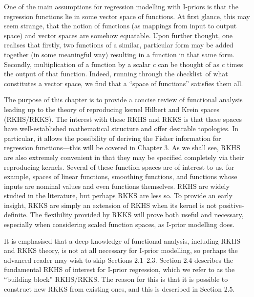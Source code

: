 \documentclass[a4paper,showframe,11pt,draft]{report}
\begin{document}

One of the main assumptions for regression modelling with I-priors is that the regression functions lie in some vector space of functions.
At first glance, this may seem strange, that the notion of functions (as mappings from input to output space) and vector spaces are somehow equatable.
Upon further thought, one realises that firstly, two functions of a similar, particular form may be added together (in some meaningful way) resulting in a function in that same form. 
Secondly, multiplication of a function by a scalar $c$ can be thought of as $c$ times the output of that function.
Indeed, running through the checklist\footnotemark~of what constitutes a vector space, we find that a ``space of functions'' satisfies them all.

The purpose of this chapter is to provide a concise review of functional analysis leading up to the theory of reproducing kernel Hilbert and Krein spaces (RKHS/RKKS).
The interest with these RKHS and RKKS is that these spaces have well-established mathematical structure and offer desirable topologies.
In particular, it allows the possibility of deriving the Fisher information for regression functions---this will be covered in Chapter 3.
As we shall see, RKHS are also extremely convenient in that they may be specified completely via their reproducing kernels.
Several of these function spaces are of interest to us, for example, spaces of linear functions, smoothing functions, and functions whose inputs are nominal values and even functions themselves.
RKHS are widely studied in the literature, but perhaps RKKS are less so.
To provide an early insight, RKKS are simply an extension of RKHS when its kernel is not positive-definite.
The flexibility provided by RKKS will prove both useful and necessary, especially when considering scaled function spaces, as I-prior modelling does.

It is emphasised that a deep knowledge of functional analysis, including RKHS and RKKS theory, is not at all necessary for I-prior modelling, so perhaps the advanced reader may wish to skip Sections 2.1--2.3. 
Section 2.4 describes the fundamental RKHS of interest for I-prior regression, which we refer to as the ``building block'' RKHS/RKKS.
The reason for this is that it is possible to construct new RKKS from existing ones, and this is described in Section 2.5.
\end{document}
